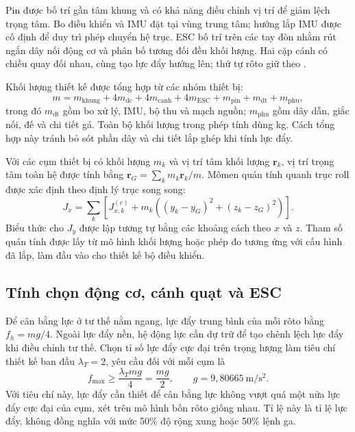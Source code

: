Pin được bố trí gần tâm khung và có khả năng điều chỉnh vị trí để giảm lệch trọng tâm. Bo điều khiển và IMU đặt tại vùng trung tâm; hướng lắp IMU được cố định để duy trì phép chuyển hệ trục. ESC bố trí trên các tay đòn nhằm rút ngắn dây nối động cơ và phân bố tương đối đều khối lượng. Hai cặp cánh có chiều quay đối nhau, cùng tạo lực đẩy hướng lên; thứ tự rôto giữ theo .

Khối lượng thiết kế được tổng hợp từ các nhóm thiết bị:
\begin{equation}
	m=m_{\mathrm{khung}}+4m_{\mathrm{dc}}+4m_{\mathrm{canh}}
	+4m_{\mathrm{ESC}}+m_{\mathrm{pin}}+m_{\mathrm{dt}}
	+m_{\mathrm{phu}},
	\label{eq:design-mass-budget}
\end{equation}
trong đó $m_{\mathrm{dt}}$ gồm bo xử lý, IMU, bộ thu và mạch nguồn; $m_{\mathrm{phu}}$ gồm dây dẫn, giắc nối, đế và chi tiết gá. Toàn bộ khối lượng trong phép tính dùng kg. Cách tổng hợp này tránh bỏ sót phần dây và chi tiết lắp ghép khi tính lực đẩy.

Với các cụm thiết bị có khối lượng $m_k$ và vị trí tâm khối lượng $\mathbf r_k$, vị trí trọng tâm toàn hệ được tính bằng $\mathbf r_G=\sum_k m_k\mathbf r_k/m$. Mômen quán tính quanh trục roll được xác định theo định lý trục song song:
\begin{equation}
	J_x=\sum_k\left[J_{x,k}^{(c)}
		+m_k\left((y_k-y_G)^2+(z_k-z_G)^2\right)\right].
	\label{eq:design-inertia}
\end{equation}
Biểu thức cho $J_y$ được lập tương tự bằng các khoảng cách theo $x$ và $z$. Tham số quán tính được lấy từ mô hình khối lượng hoặc phép đo tương ứng với cấu hình đã lắp, làm đầu vào cho thiết kế bộ điều khiển.

\subsection{Tính chọn động cơ, cánh quạt và ESC}

Để cân bằng lực ở tư thế nằm ngang, lực đẩy trung bình của mỗi rôto bằng $f_h=mg/4$. Ngoài lực đẩy nền, hệ động lực cần dự trữ để tạo chênh lệch lực đẩy khi điều chỉnh tư thế. Chọn tỉ số lực đẩy cực đại trên trọng lượng làm tiêu chí thiết kế ban đầu $\lambda_T=2$, yêu cầu đối với mỗi cụm là
\begin{equation}
	f_{\max}\geq\frac{\lambda_T mg}{4}
	=\frac{mg}{2},\qquad g=9{,}80665\ \mathrm{m/s^2}.
	\label{eq:design-thrust-requirement}
\end{equation}
Với tiêu chí này, lực đẩy cần thiết để cân bằng lực không vượt quá một nửa lực đẩy cực đại của cụm, xét trên mô hình bốn rôto giống nhau. Tỉ lệ này là tỉ lệ lực đẩy, không đồng nghĩa với mức 50\% độ rộng xung hoặc 50\% lệnh ga.

